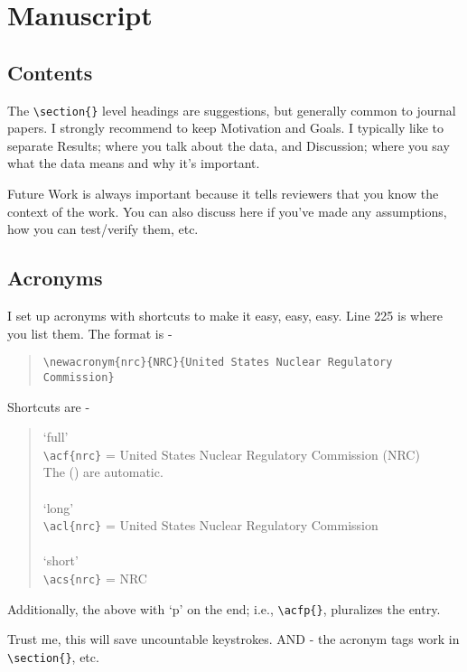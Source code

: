 \documentclass[11pt,a4paper]{article}
\begin{document}
\newpage

\section*{Manuscript}
\subsection*{Contents}
The \verb=\section{}= level headings are suggestions, but generally common to journal papers. I strongly recommend to keep Motivation and Goals. I typically like to separate Results; where you talk about the data, and Discussion; where you say what the data means and why it's important. 

Future Work is always important because it tells reviewers that you know the context of the work. You can also discuss here if you've made any assumptions, how you can test/verify them, etc.

\subsection*{Acronyms}
I set up acronyms with shortcuts to make it easy, easy, easy. Line 225 is where you list them. The format is -
\begin{quote}
    \verb=\newacronym{nrc}{NRC}{United States Nuclear Regulatory Commission}=
\end{quote}

Shortcuts are - 
\begin{quote}
    `full'\\
    \verb=\acf{nrc}= = United States Nuclear Regulatory Commission (NRC)\\
    The () are automatic.
    \\ \\
    `long'\\
    \verb=\acl{nrc}= = United States Nuclear Regulatory Commission
    \\ \\
    `short'\\
    \verb=\acs{nrc}= = NRC
\end{quote}

Additionally, the above with `p' on the end; i.e., \verb=\acfp{}=, pluralizes the entry. 

Trust me, this will save uncountable keystrokes. AND - the acronym tags work in \verb=\section{}=, etc.
\end{document}
